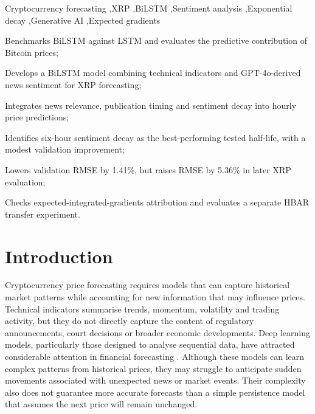 \begin{keywords}
Cryptocurrency forecasting \sep XRP \sep BiLSTM \sep Sentiment analysis \sep Exponential decay \sep Generative AI \sep Expected gradients
\end{keywords}

\begin{highlights}
\item Benchmarks BiLSTM against LSTM and evaluates the predictive contribution of Bitcoin prices;
\item Develops a BiLSTM model combining technical indicators and GPT-4o-derived news sentiment for XRP forecasting;
\item Integrates news relevance, publication timing and sentiment decay into hourly price predictions;
\item Identifies six-hour sentiment decay as the best-performing tested half-life, with a modest validation improvement;

\item Lowers validation RMSE by 1.41\%, but raises RMSE by 5.36\% in later XRP evaluation;
\item Checks expected-integrated-gradients attribution and evaluates a separate HBAR transfer experiment.
\end{highlights}
\maketitle
\section{Introduction}\label{sec:introduction}

Cryptocurrency price forecasting requires models that can capture historical market patterns while accounting for new information that may influence prices. Technical indicators summarise trends, momentum, volatility and trading activity, but they do not directly capture the content of regulatory announcements, court decisions or broader economic developments. Deep learning models, particularly those designed to analyse sequential data, have attracted considerable attention in financial forecasting \citep{Hochreiter1997,Fischer2018,Sezer2020}. Although these models can learn complex patterns from historical prices, they may struggle to anticipate sudden movements associated with unexpected news or market events. Their complexity also does not guarantee more accurate forecasts than a simple persistence model that assumes the next price will remain unchanged.

